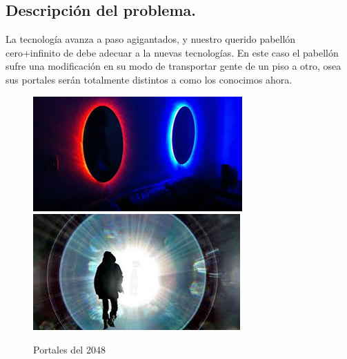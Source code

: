 \subsection{Descripción del problema.}

\vspace*{0.3cm}
 
La tecnología avanza a paso agigantados, y nuestro querido pabellón cero+infinito de debe adecuar a la nuevas tecnologías. 
En este caso el pabellón sufre una modificación en su modo de transportar gente de un piso a otro, osea sus portales serán totalmente distintos a como los conocimos ahora. \newline

\begin{figure}[H]
  \begin{center}
      \includegraphics[scale=0.70]{imagenes/portales1.jpeg}
      \includegraphics[scale=0.70]{imagenes/portales2.jpeg}
  \end{center}
  \caption{Portales del 2048}
  \label{nCte}
\end{figure}

